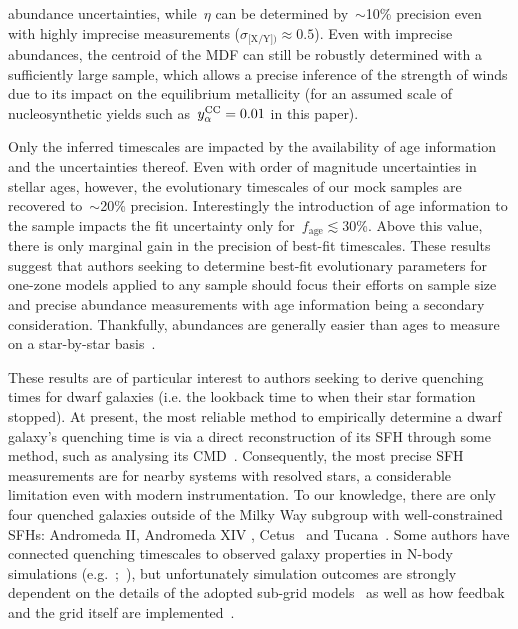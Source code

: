 \documentclass[ms.tex]{subfiles}
\begin{document}
abundance uncertainties, while~$\eta$ can be determined by~$\sim$10\% precision
even with highly imprecise measurements ($\sigma_\text{[X/Y])} \approx 0.5$).
Even with imprecise abundances, the centroid of the MDF can still be robustly
determined with a sufficiently large sample, which allows a precise inference
of the strength of winds due to its impact on the equilibrium metallicity (for
an assumed scale of nucleosynthetic yields such as~$y_\alpha^\text{CC} = 0.01$ in this
paper).
\par
Only the inferred timescales are impacted by the availability of age
information and the uncertainties thereof.
Even with order of magnitude uncertainties in stellar ages, however, the
evolutionary timescales of our mock samples are recovered to~$\sim$20\%
precision.
Interestingly the introduction of age information to the sample impacts the
fit uncertainty only for~$f_\text{age} \lesssim 30$\%.
Above this value, there is only marginal gain in the precision of best-fit
timescales.
These results suggest that authors seeking to determine best-fit evolutionary
parameters for one-zone models applied to any sample should focus their efforts
on sample size and precise abundance measurements with age information being
a secondary consideration.
Thankfully, abundances are generally easier than ages to measure on a
star-by-star basis~\citep{Soderblom2010, Chaplin2013}.
\par
These results are of particular interest to authors seeking to derive quenching
times for dwarf galaxies (i.e. the lookback time to when their star formation
stopped).
At present, the most reliable method to empirically determine a dwarf galaxy's
quenching time is via a direct reconstruction of its SFH through some method,
such as analysing its CMD~\citep[e.g.][]{Sohn2013, Weisz2015}.
Consequently, the most precise SFH measurements are for nearby systems with
resolved stars, a considerable limitation even with modern instrumentation.
To our knowledge, there are only four quenched galaxies outside of the Milky
Way subgroup with well-constrained SFHs: Andromeda II, Andromeda XIV
\citep{Weisz2014a}, Cetus~\citep{Monelli2010a} and Tucana~\citep{Monelli2010b}.
Some authors have connected quenching timescales to observed galaxy properties
in N-body simulations (e.g.~\citealp*{Rocha2012};~\citealp{Slater2013,
Slater2014, Phillips2014, Phillips2015, Wheeler2014}), but unfortunately
simulation outcomes are strongly dependent on the details of the adopted
sub-grid models~\citep[e.g.][]{Li2020} as well as how feedbak and the grid
itself are implemented~\citep{Hu2022}.
\end{document}
